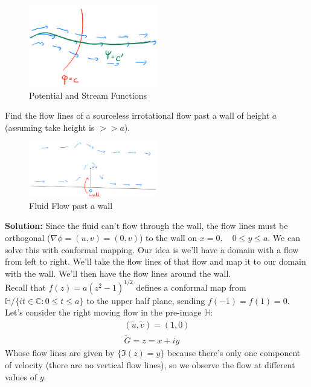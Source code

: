 \begin{figure}[H]
    \centering
    \includegraphics[width=0.5\textwidth]{LECTURE_19/potential-and-stream.png}
    \caption{Potential and Stream Functions}
\end{figure}

\begin{example}
    Find the flow lines of a sourceless irrotational flow past a wall of height $a$ (assuming take height is $>> a$).
    \begin{figure}[H]
        \centering
        \includegraphics[width=0.5\textwidth]{LECTURE_19/graph1.png}
        \caption{Fluid Flow past a wall}
    \end{figure}
    \textbf{Solution:}
    Since the fluid can't flow through the wall, the flow lines must be orthogonal ($\nabla \phi = (u,v) = (0, v)$) to the wall on $x =0 ,\quad 0 \leq y \leq a$. We can solve this with conformal mapping. Our idea is we'll have a domain with a flow from left to right. We'll take the flow lines of that flow and map it to our domain with the wall. We'll then have the flow lines around the wall. \\
    Recall that $f(z) = a(z^2 - 1)^{1/2}$ defines a conformal map from $\mathbb{H}/\{it \in \mathbb{C} : 0 \leq t \leq a\}$ to the upper half plane, sending $f(-1) = f(1) = 0$. Let's consider the right moving flow in the pre-image $\mathbb{H}$:
    \begin{align*}
        (\tilde{u}, \tilde{v}) = (1, 0) \\
        \tilde{G} = z = x + iy
    \end{align*}
    Whose flow lines are given by $\{\Im(z) = y\}$ because there's only one component of velocity (there are no vertical flow lines), so we observe the flow at different values of $y$.\\

\end{example}
